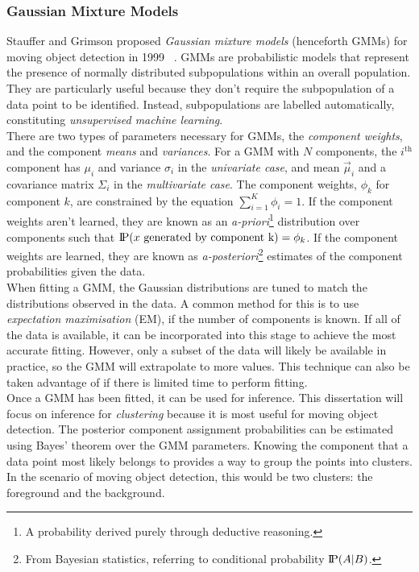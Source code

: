 \subsubsection{Gaussian Mixture Models}
\indent \indent
Stauffer and Grimson proposed \textit{Gaussian mixture models} (henceforth GMMs) for moving object detection in 1999 ~\cite{Stauffer}. GMMs are probabilistic models that represent the presence of normally distributed subpopulations within an overall population. They are particularly useful because they don't require the subpopulation of a data point to be identified. Instead, subpopulations are labelled automatically, constituting \textit{unsupervised machine learning}.
\smallskip \\ \indent
There are two types of parameters necessary for GMMs, the \textit{component weights}, and the component \textit{means} and \textit{variances}. For a GMM with $N$ components, the $i^\text{th}$ component has $\mu_i$ and variance $\sigma_i$ in the \textit{univariate case}, and mean $\vec{\mu}_i$ and a covariance matrix $\Sigma_i$ in the \textit{multivariate case}. The component weights, $\phi_k$ for component $k$, are constrained by the equation $\sum^K_{i=1} \phi_i = 1$. If the component weights aren't learned, they are known as an \textit{a-priori}\footnote{A probability derived purely through deductive reasoning.} distribution over components such that $\text{I\kern-0.15em P}(x \text{ generated by component k}) = \phi_k$. If the component weights are learned, they are known as \textit{a-posteriori}\footnote{From Bayesian statistics, referring to conditional probability $\text{I\kern-0.15em P}(A | B)$.} estimates of the component probabilities given the data.
\smallskip \\ \indent
When fitting a GMM, the Gaussian distributions are tuned to match the distributions observed in the data. A common method for this is to use \textit{expectation maximisation} (EM), if the number of components is known. If all of the data is available, it can be incorporated into this stage to achieve the most accurate fitting. However, only a subset of the data will likely be available in practice, so the GMM will extrapolate to more values. This technique can also be taken advantage of if there is limited time to perform fitting.
\smallskip \\ \indent
Once a GMM has been fitted, it can be used for inference. This dissertation will focus on inference for \textit{clustering} because it is most useful for moving object detection. The posterior component assignment probabilities can be estimated using Bayes' theorem over the GMM parameters. Knowing the component that a data point most likely belongs to provides a way to group the points into clusters. In the scenario of moving object detection, this would be two clusters: the foreground and the background.






